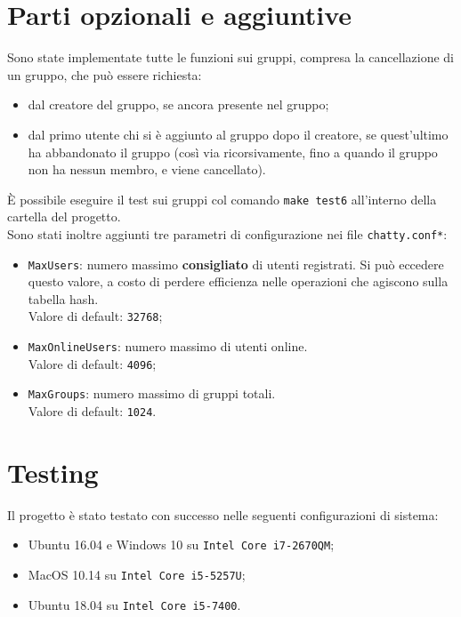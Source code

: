\documentclass{article}
\begin{document}
\section{Parti opzionali e aggiuntive}
Sono state implementate tutte le funzioni sui gruppi, compresa la cancellazione di un gruppo, che può essere richiesta:
\begin{itemize}
	\item dal creatore del gruppo, se ancora presente nel gruppo;
	\item dal primo utente chi si è aggiunto al gruppo dopo il creatore, se quest'ultimo ha abbandonato il gruppo (così via ricorsivamente, fino a quando il gruppo non ha nessun membro, e viene cancellato).
\end{itemize}

È possibile eseguire il test sui gruppi col comando \texttt{make test6} all'interno della cartella del progetto.\\

Sono stati inoltre aggiunti tre parametri di configurazione nei file \texttt{chatty.conf*}:
\begin{itemize}
	\item \texttt{MaxUsers}: numero massimo \textbf{consigliato} di utenti registrati. Si può eccedere questo valore, a costo di perdere efficienza nelle operazioni che agiscono sulla tabella hash.\\
	Valore di default: \texttt{32768};
	\item \texttt{MaxOnlineUsers}: numero massimo di utenti online.\\
	Valore di default: \texttt{4096};
	\item \texttt{MaxGroups}: numero massimo di gruppi totali.\\
	Valore di default: \texttt{1024}.
\end{itemize}


\section{Testing}
Il progetto è stato testato con successo nelle seguenti configurazioni di sistema:
\begin{itemize}
	\item Ubuntu 16.04 e Windows 10 su \texttt{Intel Core i7-2670QM};
	\item MacOS 10.14 su \texttt{Intel Core i5-5257U};
	\item Ubuntu 18.04 su \texttt{Intel Core i5-7400}.
\end{itemize}
\end{document}

